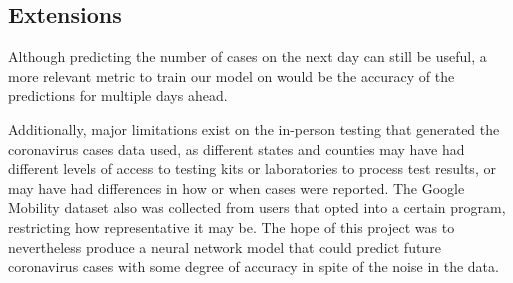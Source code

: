 ﻿\documentclass{article}
\begin{document}
\begin{multicols}{2}
\subsection*{Extensions}

Although predicting the number of cases on the next day can still be useful, a
more relevant metric to train our model on would be the accuracy of the
predictions for multiple days ahead.

Additionally, major limitations exist on the in-person testing that generated
the coronavirus cases data used, as different states and counties may have had
different levels of access to testing kits or laboratories to process test
results, or may have had differences in how or when cases were reported. The
Google Mobility dataset also was collected from users that opted into a certain
program, restricting how representative it may be. The hope of this project was
to nevertheless produce a neural network model that could predict future
coronavirus cases with some degree of accuracy in spite of the noise in the
data.

\end{multicols}
\end{document}
